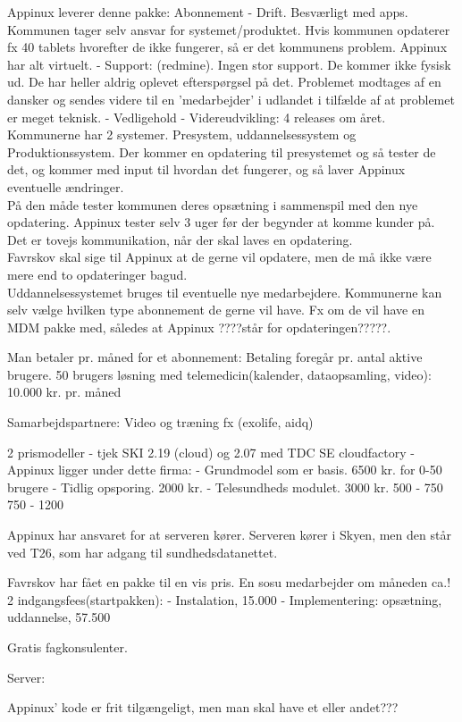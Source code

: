 Appinux leverer denne pakke:
Abonnement
 - Drift. Besværligt med apps. Kommunen tager selv ansvar for systemet/produktet. Hvis kommunen opdaterer fx 40 tablets hvorefter de ikke fungerer, så er det kommunens problem. Appinux har alt virtuelt.  
 - Support: (redmine). Ingen stor support. De kommer ikke fysisk ud. De har heller aldrig oplevet efterspørgsel på det. Problemet modtages af en dansker og sendes videre til en 'medarbejder' i udlandet i tilfælde af at problemet er meget teknisk. 
 - Vedligehold
 - Videreudvikling: 4 releases om året. 
 Kommunerne har 2 systemer. Presystem, uddannelsessystem og Produktionssystem.
 Der kommer en opdatering til presystemet og så tester de det, og kommer med input til hvordan det fungerer, og så laver Appinux eventuelle ændringer.\\
 På den måde tester kommunen deres opsætning i sammenspil med den nye opdatering.
 Appinux tester selv 3 uger før der begynder at komme kunder på. Det er tovejs kommunikation, når der skal laves en opdatering.\\
 Favrskov skal sige til Appinux at de gerne vil opdatere, men de må ikke være mere end to opdateringer bagud.\\
 Uddannelsessystemet bruges til eventuelle nye medarbejdere. 
Kommunerne kan selv vælge hvilken type abonnement de gerne vil have. Fx om de vil have en MDM pakke med, således at Appinux ????står for opdateringen?????.

Man betaler pr. måned for et abonnement:
Betaling foregår pr. antal aktive brugere.
50 brugers løsning med telemedicin(kalender, dataopsamling, video):
10.000 kr. pr. måned

Samarbejdspartnere:
Video og træning fx (exolife, aidq)


2 prismodeller - tjek SKI 2.19 (cloud) og 2.07 med TDC
SE cloudfactory - Appinux ligger under dette firma:
- Grundmodel som er basis. 6500 kr. for 0-50 brugere
- Tidlig opsporing. 2000 kr.
- Telesundheds modulet. 3000 kr.
500 - 750
750 - 1200


Appinux har ansvaret for at serveren kører. Serveren kører i Skyen, men den står ved T26, som har adgang til sundhedsdatanettet. 


Favrskov har fået en pakke til en vis pris.
En sosu medarbejder om måneden ca.!
2 indgangsfees(startpakken):
 - Instalation, 15.000
 - Implementering: opsætning, uddannelse, 57.500

Gratis fagkonsulenter.

Server:


Appinux' kode er frit tilgængeligt, men man skal have et eller andet???





